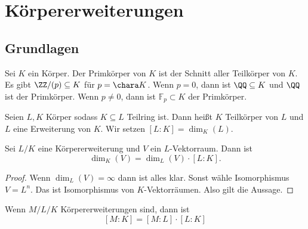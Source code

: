 \chapter{Körpererweiterungen}
\section{Grundlagen}
\begin{Def}
    Sei \(K\) ein Körper. Der Primkörper von \(K\) ist der Schnitt aller Teilkörper von \(K\).
    Es gibt \(\ZZ/(p)\subseteq K\) für \(p=\chara K\).
Wenn \(p=0\), dann ist \(\QQ\subseteq K\) und \(\QQ\) ist der Primkörper. Wenn \(p\neq 0\), dann ist \(\mathbb F_p\subset K\) der Primkörper.
\end{Def}
\begin{Def}
    Seien \(L,K\) Körper sodass \(K\subseteq L\) Teilring ist. Dann heißt \(K\) Teilkörper von \(L\) und \(L\) eine Erweiterung von \(K\). Wir setzen \([L:K]=\dim_K(L)\).
\end{Def}
\begin{Satz}
    Sei \(L/K\) eine Körpererweiterung und \(V\) ein \(L\)-Vektorraum. Dann ist \[\dim_K(V)=\dim_L(V)\cdot [L:K].\]
\end{Satz}
\begin{proof}
    Wenn \(\dim_L(V)=\infty\) dann ist alles klar. Sonst wähle Isomorphismus \(V=L^n\). Das ist Isomorphismus von \(K\)-Vektorräumen. Also gilt die Aussage.
\end{proof}
\begin{Kor}
    Wenn \(M/L/K\) Körpererweiterungen sind, dann ist 
    \[[M:K]=[M:L]\cdot[L:K]\]
\end{Kor}
